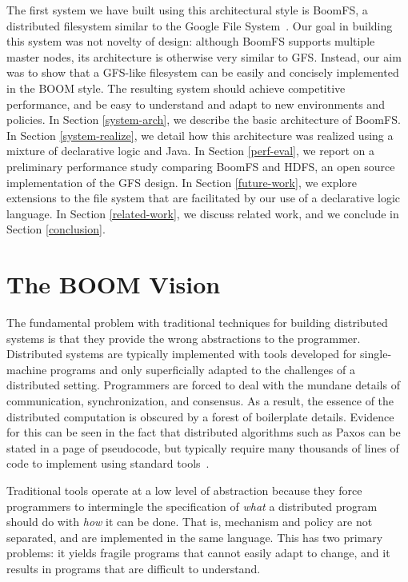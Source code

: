 \documentclass{article}
\begin{document}
The first system we have built using this architectural style is
BoomFS, a distributed filesystem similar to the Google File
System~\cite{gfs}. Our goal in building this system was not novelty of
design: although BoomFS supports multiple master nodes, its
architecture is otherwise very similar to GFS. Instead, our aim was to
show that a GFS-like filesystem can be easily and concisely
implemented in the BOOM style. The resulting system should achieve
competitive performance, and be easy to understand and adapt to new
environments and policies. In Section \ref{system-arch}, we describe
the basic architecture of BoomFS. In Section \ref{system-realize}, we
detail how this architecture was realized using a mixture of
declarative logic and Java. In Section \ref{perf-eval}, we report on a
preliminary performance study comparing BoomFS and HDFS, an open
source implementation of the GFS design. In Section \ref{future-work},
we explore extensions to the file system that are facilitated by our
use of a declarative logic language. In Section \ref{related-work}, we
discuss related work, and we conclude in Section \ref{conclusion}.

\section{The BOOM Vision}
\label{boom-vision}
The fundamental problem with traditional techniques for building
distributed systems is that they provide the wrong abstractions to the
programmer. Distributed systems are typically implemented with tools
developed for single-machine programs and only superficially adapted
to the challenges of a distributed setting. Programmers are forced to
deal with the mundane details of communication, synchronization, and
consensus. As a result, the essence of the distributed computation is
obscured by a forest of boilerplate details. Evidence for this can be
seen in the fact that distributed algorithms such as Paxos can be
stated in a page of pseudocode, but typically require many thousands
of lines of code to implement using standard
tools~\cite{paxos-made-live}.

Traditional tools operate at a low level of abstraction because they
force programmers to intermingle the specification of \emph{what} a
distributed program should do with \emph{how} it can be done. That is,
mechanism and policy are not separated, and are implemented in the
same language. This has two primary problems: it yields fragile
programs that cannot easily adapt to change, and it results in
programs that are difficult to understand.
\end{document}
